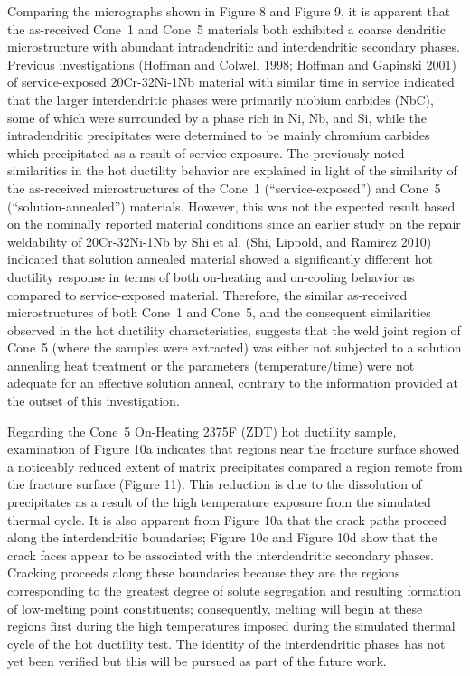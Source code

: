 Comparing the micrographs shown in Figure 8 and Figure 9, it is apparent that the as-received Cone~1 and Cone~5 materials both exhibited a coarse dendritic microstructure with abundant intradendritic and interdendritic secondary phases.  Previous investigations (Hoffman and Colwell 1998; Hoffman and Gapinski 2001) of service-exposed 20Cr-32Ni-1Nb material with similar time in service indicated that the larger interdendritic phases were primarily niobium carbides (NbC), some of which were surrounded by a phase rich in Ni, Nb, and Si, while the intradendritic precipitates were determined to be mainly chromium carbides which precipitated as a result of service exposure.  The previously noted similarities in the hot ductility behavior are explained in light of the similarity of the as-received microstructures of the Cone~1 (``service-exposed'') and Cone~5 (``solution-annealed'') materials.  However, this was not the expected result based on the nominally reported material conditions since an earlier study on the repair weldability of 20Cr-32Ni-1Nb by Shi et al. (Shi, Lippold, and Ramirez 2010) indicated that solution annealed material showed a significantly different hot ductility response in terms of both on-heating and on-cooling behavior as compared to service-exposed material.  Therefore, the similar as-received microstructures of both Cone~1 and Cone~5, and the consequent similarities observed in the hot ductility characteristics, suggests that the weld joint region of Cone~5 (where the samples were extracted) was either not subjected to a solution annealing heat treatment or the parameters (temperature/time) were not adequate for an effective solution anneal, contrary to the information provided at the outset of this investigation.

Regarding the Cone~5 On-Heating 2375\textdegree{}F (ZDT) hot ductility sample, examination of Figure 10a indicates that regions near the fracture surface showed a noticeably reduced extent of matrix precipitates compared a region remote from the fracture surface  (Figure 11).  This reduction is due to the dissolution of precipitates as a result of the high temperature exposure from the simulated thermal cycle.  It is also apparent from Figure 10a that the crack paths proceed along the interdendritic boundaries; Figure 10c and Figure 10d show that the crack faces appear to be associated with the interdendritic secondary phases.  Cracking proceeds along these boundaries because they are the regions corresponding to the greatest degree of solute segregation and resulting formation of low-melting point constituents; consequently, melting will begin at these regions first during the high temperatures imposed during the simulated thermal cycle of the hot ductility test.  The identity of the interdendritic phases has not yet been verified but this will be pursued as part of the future work.
